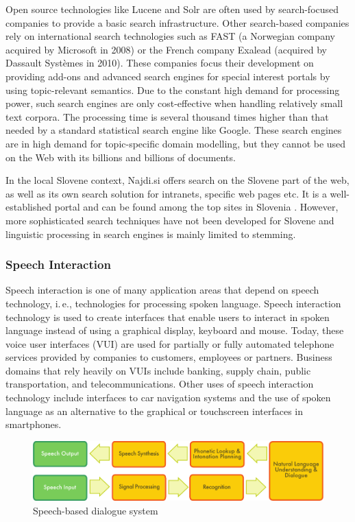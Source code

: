 \begin{multicols}{2}
Open source technologies like Lucene and Solr are often used by search-focused companies to provide a basic search infrastructure. Other search-based companies rely on international search technologies such as FAST (a Norwegian company acquired by Microsoft in 2008) or the French company Exalead (acquired by Dassault Systèmes in 2010). These companies focus their development on providing add-ons and advanced search engines for special interest portals by using topic-relevant semantics. Due to the constant high demand for processing power, such search engines are only cost-effective when handling relatively small text corpora. The processing time is several thousand times higher than that needed by a standard statistical search engine like Google. These search engines are in high demand for topic-specific domain modelling, but they cannot be used on the Web with its billions and billions of documents.

In the local Slovene context, Najdi.si offers search on the Slovene part of the web, as well as its own search solution for intranets, specific web pages etc. It is a well-established portal and can be found among the top sites in Slovenia \cite{moss1}.  However, more sophisticated search techniques have not been developed for Slovene and linguistic processing in search engines is mainly limited to stemming. 

\subsubsection{Speech Interaction}

Speech interaction is one of many application areas that depend on speech technology, i.\,e., technologies for processing spoken language. Speech interaction technology is used to create interfaces that enable users to interact in spoken language instead of using a graphical display, keyboard and mouse.  Today, these voice user interfaces (VUI) are used for partially or fully automated telephone services provided by companies to customers, employees or partners. Business domains that rely heavily on VUIs include banking, supply chain, public transportation, and telecommunications. Other uses of speech interaction technology include interfaces to car navigation systems and the use of spoken language as an alternative to the graphical or touchscreen interfaces in smartphones.

\begin{figure}[htb]
  \center
  \includegraphics[width=\textwidth]{../_media/english/simple_speech-based_dialogue_architecture}
  \caption{Speech-based dialogue system}
  \label{fig:dialoguearch_en}
\end{figure}


\end{multicols}
